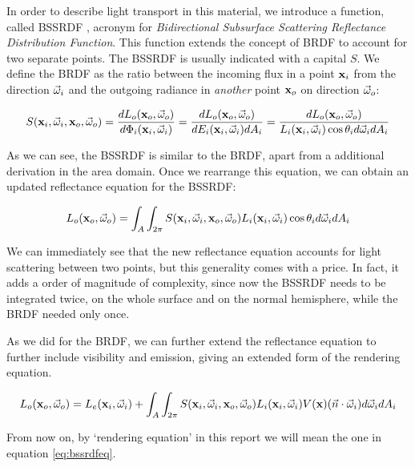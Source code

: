 In order to describe light transport in this material, we introduce a function, called BSSRDF \citep{Nicodemus:1992:GCN:136913.136929}, acronym for \emph{Bidirectional Subsurface Scattering Reflectance Distribution Function}. This function extends the concept of BRDF to account for two separate points. The BSSRDF is usually indicated with a capital $S$. We define the BRDF as the ratio between the incoming flux in a point $\mathbf{x}_i$ from the direction $\vec{\omega}_i$ and the outgoing radiance in \emph{another} point $\mathbf{x}_o$ on direction $\vec{\omega}_o$:

$$
S(\mathbf{x}_i, \vec{\omega}_i, \mathbf{x}_o, \vec{\omega}_o) = \frac{d L_o(\mathbf{x}_o,\vec{\omega}_o)}{d \Phi_i(\mathbf{x}_i,\vec{\omega}_i)} = \frac{d L_o(\mathbf{x}_o,\vec{\omega}_o)}{d E_i(\mathbf{x}_i,\vec{\omega}_i) d A_i} = \frac{d L_o(\mathbf{x}_o,\vec{\omega}_o)}{L_i(\mathbf{x}_i,\vec{\omega}_i) \cos \theta_i d\vec{\omega}_i d A_i}  
$$

As we can see, the BSSRDF is similar to the BRDF, apart from a additional derivation in the area domain. Once we rearrange this equation, we can obtain an updated reflectance equation for the BSSRDF:

$$
L_o(\mathbf{x}_o,\vec{\omega}_o) = \int_A \int_{2\pi} S(\mathbf{x}_i, \vec{\omega}_i, \mathbf{x}_o, \vec{\omega}_o) L_i(\mathbf{x}_i,\vec{\omega}_i) \cos \theta_i d\vec{\omega}_i d A_i
$$

We can immediately see that the new reflectance equation accounts for light scattering between two points, but this generality comes with a price. In fact, it adds a order of magnitude of complexity, since now the BSSRDF needs to be integrated twice, on the whole surface and on the normal hemisphere, while the BRDF needed only once. 

As we did for the BRDF, we can further extend the reflectance equation to further include visibility and emission, giving an extended form of the rendering equation. 

\begin{equation}
L_o(\mathbf{x}_o,\vec{\omega}_o) = L_e(\mathbf{x}_i,\vec{\omega}_i) + \int_A \int_{2\pi} S(\mathbf{x}_i, \vec{\omega}_i, \mathbf{x}_o, \vec{\omega}_o) L_i(\mathbf{x}_i,\vec{\omega}_i) V(\mathbf{x}) (\vec{n} \cdot \vec{\omega}_i) d\vec{\omega}_i d A_i
\label{eq:bssrdfeq}
\end{equation}

From now on, by `rendering equation' in this report we will mean the one in equation \ref{eq:bssrdfeq}. 

